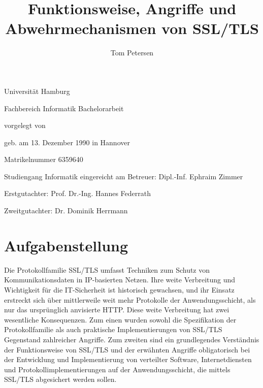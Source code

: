\documentclass[
    12pt,
    headings=small,
    parskip=half,           %
    bibliography=totoc,
    numbers=noenddot,       %
    open=any,               %
   final                   %
    ]{scrreprt}
\title{Funktionsweise, Angriffe und Abwehrmechanismen von SSL/TLS}
\author{Tom Petersen}
\begin{document}
\thispagestyle{empty}
\begin{titlepage}%
\begin{center}\Large
	Universität Hamburg \par
	Fachbereich Informatik
	\vfill
	Bachelorarbeit
	\vfill
	\makeatletter
	{\Large\textsf{\textbf{\@title}}\par}
	\makeatother
	\vfill
	vorgelegt von
	\par\bigskip
	\makeatletter
	{\@author} \par
	\makeatother
	geb. am 13. Dezember 1990 in Hannover \par
	Matrikelnummer 6359640 \par
	Studiengang Informatik
	\vfill
	\makeatletter
	eingereicht am {\@date}
	\makeatother
	\vfill
	Betreuer: Dipl.-Inf. Ephraim Zimmer\par
	Erstgutachter: Prof. Dr.-Ing. Hannes Federrath \par
	Zweitgutachter: Dr. Dominik Herrmann
\end{center}
\end{titlepage}%

\chapter*{Aufgabenstellung}

Die Protokollfamilie SSL/TLS umfasst Techniken zum Schutz von Kommunikationsdaten in IP-basierten Netzen. Ihre weite Verbreitung und Wichtigkeit für die IT-Sicherheit ist historisch gewachsen, und ihr Einsatz erstreckt sich über mittlerweile weit mehr Protokolle der Anwendungsschicht, als nur das ursprünglich anvisierte HTTP. Diese weite Verbreitung hat zwei wesentliche Konsequenzen. Zum einen wurden sowohl die Spezifikation der Protokollfamilie als auch praktische Implementierungen von SSL/TLS Gegenstand zahlreicher Angriffe. Zum zweiten sind ein grundlegendes Verständnis der Funktionsweise von SSL/TLS und der erwähnten Angriffe obligatorisch bei der Entwicklung und Implementierung von verteilter Software, Internetdiensten und Protokollimplementierungen auf der Anwendungsschicht, die mittels SSL/TLS abgesichert werden sollen. 
\end{document}
